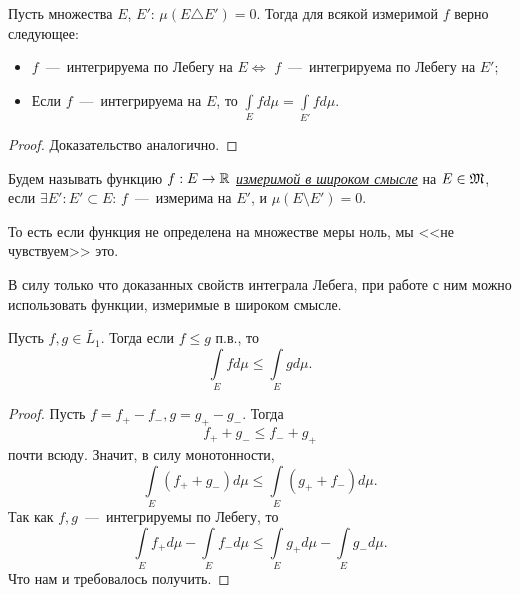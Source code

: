 \begin{proposition}
    Пусть множества $E$, $E'$: $\mu(E \triangle E') = 0$. Тогда для всякой измеримой $f$ верно следующее:
    \begin{itemize}
        \item $f$~---~интегрируема по Лебегу на $E \Longleftrightarrow$ $f$~---~интегрируема по Лебегу на $E'$;
        \item Если $f$~---~интегрируема на $E$, то $\int\limits_E fd\mu = \int\limits_{E'} fd\mu$.
    \end{itemize}
\end{proposition}
\begin{proof}
    Доказательство аналогично.
\end{proof}

\begin{definition}
    Будем называть функцию $f: E \rightarrow \mathbb{R}$ \textit{
\underline{измеримой в широком смысле}} на $E \in \mathfrak{M}$, если $\exists E': E'\subset E$: $f$~---~измерима на $E'$, и $\mu(E\setminus E') = 0$. \\
\end{definition}

\begin{remark}
    То есть если функция не определена на множестве меры ноль, мы <<не чувствуем>> это.
\end{remark}

\begin{note}
    В силу только что доказанных свойств интеграла Лебега, при работе с ним можно использовать функции, измеримые в широком смысле.
\end{note}

\begin{proposition}
    Пусть $f, g \in \widetilde{L_1}$. Тогда если $f \leq g$ п.в., то \[\int\limits_E fd\mu \leq \int\limits_E gd\mu.\]
\end{proposition}
\begin{proof}
    Пусть $f = f_+ - f_-, g = g_+ - g_-$. Тогда \[f_+ + g_- \leq f_- + g_+\]
    почти всюду. Значит, в силу монотонности, \[\int\limits_E (f_+ + g_-) d\mu \leq \int\limits_E (g_+ + f_-) d\mu.\]
    Так как $f, g$~---~интегрируемы по Лебегу, то \[\int\limits_E f_+d\mu - \int\limits_E f_-d\mu \leq \int\limits_E g_+d\mu - \int\limits_E g_-d\mu.\]
    Что нам и требовалось получить.
\end{proof}



